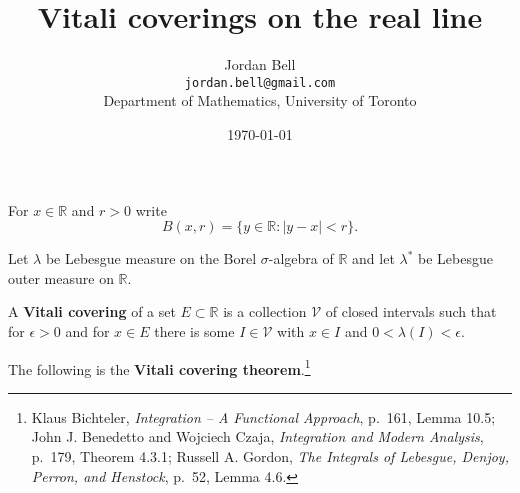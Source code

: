 \documentclass{article}
\theoremstyle{definition}
\begin{document}
\title{Vitali coverings on the real line}
\author{Jordan Bell\\ \texttt{jordan.bell@gmail.com}\\Department of Mathematics, University of Toronto}
\date{\today}

\maketitle

For $x \in \mathbb{R}$ and $r>0$ write
\[
B(x,r) = \{y \in \mathbb{R}: |y-x|<r\}.
\]

Let
$\lambda$ be Lebesgue measure on the Borel $\sigma$-algebra of $\mathbb{R}$ and
let $\lambda^*$ be Lebesgue outer measure on $\mathbb{R}$. 

A \textbf{Vitali covering} of a set $E \subset \mathbb{R}$ is a collection $\mathcal{V}$ 
of  closed intervals such that for $\epsilon>0$ and for $x \in E$ there is some $I \in \mathcal{V}$ 
with $x \in I$ and
$0<\lambda(I)<\epsilon$.

The following is the \textbf{Vitali covering theorem}.\footnote{Klaus Bichteler, {\em Integration -- A Functional Approach},
p.~161, Lemma 10.5;
John J. Benedetto and Wojciech Czaja, {\em Integration and Modern Analysis}, p.~179, Theorem 4.3.1;
Russell A. Gordon, {\em The Integrals of Lebesgue, Denjoy, Perron, and Henstock}, p.~52, Lemma 4.6.}
\end{document}
